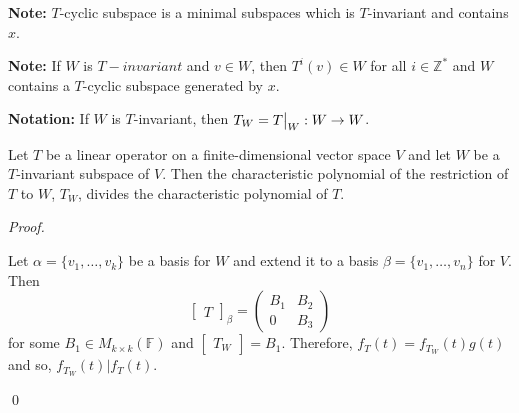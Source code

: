 \documentclass[12pt]{article}
\newenvironment{theorem}[2][Theorem]{\begin{trivlist}
\item[\hskip \labelsep {\bfseries #1}\hskip \labelsep {\bfseries #2.}]}{\end{trivlist}}
\newenvironment{sol}
    {\emph{Proof.}
    }
    {
    \qed
    }
\newcommand\restr[2]{{%
  \left.\kern-\nulldelimiterspace %
  #1 %
  \vphantom{\big|} %
  \right|_{#2} %
  }}
\begin{document}
\textbf{Note:} $T$-cyclic subspace is a minimal subspaces which is $T$-invariant and contains $x$.

\textbf{Note:} If $W$ is $T-invariant$ and $v \in W$, then $T^i(v) \in W$ for all $i \in \mathbb{Z}^*$ and $W$ contains a $T$-cyclic subspace generated by $x$.

\textbf{Notation:} If $W$ is $T$-invariant, then $T_W = \restr{T}{W} : W \to W$.

\begin{theorem}{5.21}
Let $T$ be a linear operator on a finite-dimensional vector space $V$ and let $W$ be a $T$-invariant subspace of $V$. Then the characteristic polynomial of the restriction of $T$ to $W$, $T_W$, divides the characteristic polynomial of $T$. 
\end{theorem}

\begin{sol}
Let $\alpha = \{v_1, \dots, v_k\}$ be a basis for $W$ and extend it to a basis $\beta = \{v_1, \dots, v_n\}$ for $V$. Then $$\begin{bmatrix}
T
\end{bmatrix}_\beta = \begin{pmatrix}
B_1 & B_2 \\ 0 & B_3
\end{pmatrix}$$ for some $B_1 \in M_{k \times k}(\mathbb{F})$ and $\begin{bmatrix}
T_W
\end{bmatrix} = B_1$. Therefore, $f_T(t) = f_{T_W}(t)g(t)$ and so, $f_{T_W}(t) | f_T(t)$.
\end{sol}

\vspace{1em}
\end{document}
